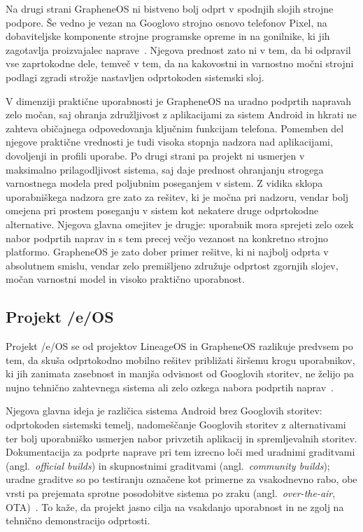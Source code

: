 \documentclass[a4paper,12pt,openright]{book}
\begin{document}
Na drugi strani GrapheneOS ni bistveno bolj odprt v spodnjih slojih strojne podpore.
Še vedno je vezan na Googlovo strojno osnovo telefonov Pixel, na dobaviteljske komponente strojne programske opreme in na gonilnike, ki jih zagotavlja proizvajalec naprave~\cite{grapheneos_faq}.
Njegova prednost zato ni v tem, da bi odpravil vse zaprtokodne dele, temveč v tem, da na kakovostni in varnostno močni strojni podlagi zgradi strožje nastavljen odprtokoden sistemski sloj.

V dimenziji praktične uporabnosti je GrapheneOS na uradno podprtih napravah zelo močan, saj ohranja združljivost z aplikacijami za sistem Android in hkrati ne zahteva običajnega odpovedovanja ključnim funkcijam telefona.
Pomemben del njegove praktične vrednosti je tudi visoka stopnja nadzora nad aplikacijami, dovoljenji in profili uporabe.
Po drugi strani pa projekt ni usmerjen v maksimalno prilagodljivost sistema, saj daje prednost ohranjanju strogega varnostnega modela pred poljubnim poseganjem v sistem.
Z vidika sklopa uporabniškega nadzora gre zato za rešitev, ki je močna pri nadzoru, vendar bolj omejena pri prostem poseganju v sistem kot nekatere druge odprtokodne alternative.
Njegova glavna omejitev je drugje:
uporabnik mora sprejeti zelo ozek nabor podprtih naprav in s tem precej večjo vezanost na konkretno strojno platformo.
GrapheneOS je zato dober primer rešitve, ki ni najbolj odprta v absolutnem smislu, vendar zelo premišljeno združuje odprtost zgornjih slojev, močan varnostni model in visoko praktično uporabnost.

\subsection{Projekt /e/OS}

Projekt /e/OS se od projektov LineageOS in GrapheneOS razlikuje predvsem po tem, da skuša odprtokodno mobilno rešitev približati širšemu krogu uporabnikov, ki jih zanimata zasebnost in manjša odvisnost od Googlovih storitev, ne želijo pa nujno tehnično zahtevnega sistema ali zelo ozkega nabora podprtih naprav~\cite{eos_devices,eos_build_types}.

Njegova glavna ideja je različica sistema Android brez Googlovih storitev:
odprtokoden sistemski temelj, nadomeščanje Googlovih storitev z alternativami ter bolj uporabniško usmerjen nabor privzetih aplikacij in spremljevalnih storitev.
Dokumentacija za podprte naprave pri tem izrecno loči med uradnimi graditvami (angl.~\textit{official builds}) in skupnostnimi graditvami (angl.~\textit{community builds}); uradne graditve so po testiranju označene kot primerne za vsakodnevno rabo, obe vrsti pa prejemata sprotne posodobitve sistema po zraku (angl.~\textit{over-the-air}, OTA)~\cite{eos_devices}.
To kaže, da projekt jasno cilja na vsakdanjo uporabnost in ne zgolj na tehnično demonstracijo odprtosti.
\end{document}
